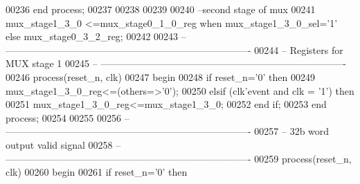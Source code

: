 \begin{DoxyCode}
00236     \textcolor{keywordflow}{end} \textcolor{keywordflow}{process};
00237 
00238 
00239 
00240 \textcolor{keyword}{--second stage of mux}
00241 \textcolor{vhdlchar}{mux_stage1_3_0}  \textcolor{vhdlchar}{<=}\textcolor{vhdlchar}{mux_stage0_1_0_reg} \textcolor{keywordflow}{when} \textcolor{vhdlchar}{mux_stage1_3_0_sel}\textcolor{vhdlchar}{=}\textcolor{vhdlchar}{'}\textcolor{vhdllogic}{}\textcolor{vhdllogic}{1}\textcolor{vhdlchar}{'} \textcolor{keywordflow}{else} \textcolor{vhdlchar}{
      mux_stage0_3_2_reg};
00242 
00243 \textcolor{keyword}{-- ----------------------------------------------------------------------------}
00244 \textcolor{keyword}{-- Registers for MUX stage 1}
00245 \textcolor{keyword}{-- ----------------------------------------------------------------------------  }
00246   \textcolor{keywordflow}{process}(reset_n, clk)
00247 \textcolor{vhdlkeyword}{    begin}
00248       \textcolor{keywordflow}{if} \textcolor{vhdlchar}{reset_n}\textcolor{vhdlchar}{=}\textcolor{vhdlchar}{'}\textcolor{vhdllogic}{}\textcolor{vhdllogic}{0}\textcolor{vhdlchar}{'} \textcolor{keywordflow}{then}
00249             \textcolor{vhdlchar}{mux_stage1_3_0_reg}\textcolor{vhdlchar}{<=}\textcolor{vhdlchar}{(}\textcolor{keywordflow}{others}\textcolor{vhdlchar}{=}\textcolor{vhdlchar}{>}\textcolor{vhdlchar}{'}\textcolor{vhdllogic}{}\textcolor{vhdllogic}{0}\textcolor{vhdlchar}{'}\textcolor{vhdlchar}{)};
00250       \textcolor{keywordflow}{elsif} \textcolor{vhdlchar}{(}\textcolor{vhdlchar}{clk}\textcolor{vhdlchar}{'}\textcolor{vhdlkeyword}{event} \textcolor{keywordflow}{and} \textcolor{vhdlchar}{clk} \textcolor{vhdlchar}{=} \textcolor{vhdlchar}{'}\textcolor{vhdllogic}{}\textcolor{vhdllogic}{1}\textcolor{vhdlchar}{'}\textcolor{vhdlchar}{)} \textcolor{keywordflow}{then}
00251             \textcolor{vhdlchar}{mux_stage1_3_0_reg}\textcolor{vhdlchar}{<=}\textcolor{vhdlchar}{mux_stage1_3_0};
00252         \textcolor{keywordflow}{end} \textcolor{keywordflow}{if};
00253     \textcolor{keywordflow}{end} \textcolor{keywordflow}{process};
00254 
00255 
00256 \textcolor{keyword}{-- ----------------------------------------------------------------------------}
00257 \textcolor{keyword}{-- 32b word output valid signal}
00258 \textcolor{keyword}{-- ----------------------------------------------------------------------------}
00259   \textcolor{keywordflow}{process}(reset_n, clk)
00260 \textcolor{vhdlkeyword}{    begin}
00261       \textcolor{keywordflow}{if} \textcolor{vhdlchar}{reset_n}\textcolor{vhdlchar}{=}\textcolor{vhdlchar}{'}\textcolor{vhdllogic}{}\textcolor{vhdllogic}{0}\textcolor{vhdlchar}{'} \textcolor{keywordflow}{then}

\end{DoxyCode}

